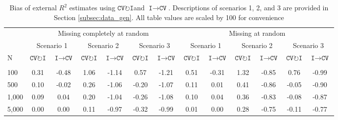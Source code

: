 \documentclass[AMA,STIX1COL,doublespace]{WileyNJD-v2}
\begin{document}
\begin{table}

\caption{\label{tab:bias}Bias of external $R^2$ estimates using $\texttt{CV}\!\circlearrowright\!\texttt{I}$\space and $\texttt{I}\!\!\rightarrow\!\texttt{CV}$. Descriptions of scenarios 1, 2, and 3 are provided in Section \ref{subsec:data_gen}. All table values are scaled by 100 for convenience}
\centering
\begin{tabular}[t]{lcccccccccccc}
\toprule
\multicolumn{1}{c}{ } & \multicolumn{6}{c}{Missing completely at random} & \multicolumn{6}{c}{Missing at random} \\
\cmidrule(l{3pt}r{3pt}){2-7} \cmidrule(l{3pt}r{3pt}){8-13}
\multicolumn{1}{c}{ } & \multicolumn{2}{c}{Scenario 1} & \multicolumn{2}{c}{Scenario 2} & \multicolumn{2}{c}{Scenario 3} & \multicolumn{2}{c}{Scenario 1} & \multicolumn{2}{c}{Scenario 2} & \multicolumn{2}{c}{Scenario 3} \\
\cmidrule(l{3pt}r{3pt}){2-3} \cmidrule(l{3pt}r{3pt}){4-5} \cmidrule(l{3pt}r{3pt}){6-7} \cmidrule(l{3pt}r{3pt}){8-9} \cmidrule(l{3pt}r{3pt}){10-11} \cmidrule(l{3pt}r{3pt}){12-13}
N & $\texttt{CV}\!\circlearrowright\!\texttt{I}$& $\texttt{I}\!\!\rightarrow\!\texttt{CV}$& $\texttt{CV}\!\circlearrowright\!\texttt{I}$& $\texttt{I}\!\!\rightarrow\!\texttt{CV}$& $\texttt{CV}\!\circlearrowright\!\texttt{I}$& $\texttt{I}\!\!\rightarrow\!\texttt{CV}$& $\texttt{CV}\!\circlearrowright\!\texttt{I}$& $\texttt{I}\!\!\rightarrow\!\texttt{CV}$& $\texttt{CV}\!\circlearrowright\!\texttt{I}$& $\texttt{I}\!\!\rightarrow\!\texttt{CV}$& $\texttt{CV}\!\circlearrowright\!\texttt{I}$& $\texttt{I}\!\!\rightarrow\!\texttt{CV}$\\
\midrule
\addlinespace[0.75em]
\multicolumn{13}{l}{\textbf{10 predictors, 10 junk}}\\
\hline
\hspace{1em}100 & 0.31 & -0.48 & 1.06 & -1.14 & 0.57 & -1.21 & 0.51 & -0.31 & 1.32 & -0.85 & 0.76 & -0.99\\
\hspace{1em}500 & 0.10 & -0.02 & 0.26 & -1.06 & -0.20 & -1.07 & 0.11 & 0.01 & 0.41 & -0.86 & -0.05 & -0.90\\
\hspace{1em}1,000 & 0.09 & 0.04 & 0.20 & -1.04 & -0.26 & -1.08 & 0.10 & 0.04 & 0.36 & -0.83 & -0.08 & -0.87\\
\hspace{1em}5,000 & 0.00 & 0.00 & 0.11 & -0.97 & -0.32 & -0.99 & 0.01 & 0.00 & 0.28 & -0.75 & -0.11 & -0.77\\

\end{tabular}
\end{table}
\end{document}
